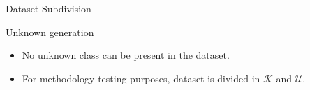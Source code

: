 \begin{frame}{Dataset Subdivision}
    \begin{normalblock}{Unknown generation}
        \begin{itemize}
          \item No unknown class can be present in the dataset.
          \item For methodology testing purposes, dataset is divided in $\mathcal{K}$ and $\mathcal{U}$.
        \end{itemize}
    \end{normalblock}

    \begin{table}
        \noindent
        \caption*{Subsets of the original dataset.}
    \end{table}
\end{frame}

